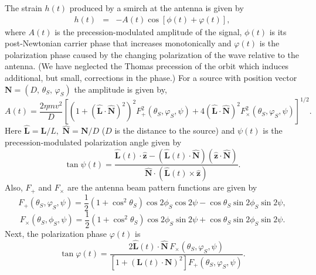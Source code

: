 The strain $h(t)$ produced by a smirch at the antenna is given by
\begin{eqnarray}
 h(t) & = & -A(t)\cos[\phi(t)+\varphi(t)],
\label{eqn:waveform}
\end{eqnarray}
where $A(t)$ is the precession-modulated amplitude of the signal,
$\phi(t)$ is its post-Newtonian carrier phase that
increases monotonically and $\varphi(t)$ is the polarization phase caused 
by the changing polarization of the wave relative to the antenna. (We have
neglected the Thomas precession of the orbit which induces additional, but
small, corrections in the phase.) For a source with position vector 
${\mathbf N} = (D,\, \theta_S,\, \varphi_S)$ the amplitude is given by,
\begin{equation}
 A(t) = \frac{2\eta m v^2}{D}
\left[ \left( 1 + (\hat {\mathbf L}\cdot \hat {\mathbf N})^2\right )^2 F_{+}^2(\theta_S,\varphi_S,\psi) 
 + 4 \left ( \hat {\mathbf L}\cdot \hat {\mathbf N} \right )^2 F_\times^2(\theta_S,\varphi_S,\psi) \right]^{1/2}. 
\label{eqn:amplitude}
\end{equation}
Here $\hat{\mathbf L} = {\mathbf L}/L,$ $\hat{\mathbf N} = {\mathbf N}/D$ ($D$ is the distance to 
the source) and $\psi(t)$ is the precession-modulated polarization angle given by 
\begin{equation}
\tan \psi(t) = 
\frac{\hat{\mathbf L}(t)\cdot\hat{\mathbf z} - (\hat{\mathbf L}(t)\cdot\hat{\mathbf N})
(\hat{\mathbf z}\cdot\hat{\mathbf N})}
{\hat{\mathbf N}\cdot(\hat{\mathbf L}(t)\times\hat{\mathbf z})}.
\label{eqn:psi(t)}
\end{equation} 
Also, $F_+$ and $F_\times$ are the antenna beam pattern functions are given by
\begin{equation}
F_+(\theta_S,\varphi_S,\psi) = \frac{1}{2}\left(1+\cos^2\theta_S\right)\cos{2\phi_S}\cos{2\psi} 
- \cos\theta_S\sin{2\phi_S}\sin{2\psi}, 
\end{equation}
\begin{equation}
F_{\times}(\theta_S,\phi_S,\psi) = 
\frac{1}{2}\left(1+\cos^2\theta_S\right)\cos{2\phi_S}\sin{2\psi}
+ \cos\theta_S\sin{2\phi_S}\sin{2\psi}.
\end{equation}
Next, the polarization phase $\varphi(t)$ is 
\begin{equation}
\tan \varphi(t) = 
\frac{ 2 \hat {\mathbf L}(t) \cdot \hat {\mathbf N}\, F_\times(\theta_S,\varphi_S,\psi)}
{\left [ 1 + \left ({\mathbf L}(t)\cdot {\mathbf N} \right )^2 \right ] F_{+}(\theta_S,\varphi_S,\psi)}.
\label{eqn:varphi}
\end{equation}
